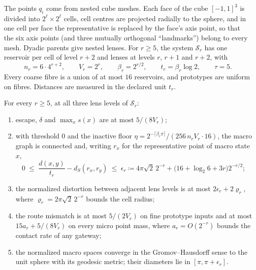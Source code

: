 The points $q_i$ come from nested cube meshes.
Each face of the cube $[-1,1]^3$ is divided into $2^{\ell}\times2^{\ell}$ cells, cell centres are projected radially to the sphere, and in one cell per face the representative is replaced by the face's axis point, so that the six axis points (and three mutually orthogonal ``landmarks'') belong to every mesh.
Dyadic parents give nested lenses.
For $r\ge5$, the system $\mathcal S_r$ has one reservoir per cell of level $r+2$ and lenses at levels $r$, $r+1$ and $r+2$, with
\begin{equation}
n_r=6\cdot4^{r+2},\qquad V_r=2^r,\qquad \beta_r=2^{r/2},\qquad t_r=\beta_r\log2,\qquad\tau=5.
\end{equation}
Every coarse fibre is a union of at most $16$ reservoirs, and prototypes are uniform on fibres.
Distances are measured in the declared unit $t_r$.

\begin{theorem}
\label{thm:sphere}
For every $r\ge5$, at all three lens levels of $\mathcal S_r$:
\begin{enumerate}[label=(\roman*)]
\item escape, $\delta$ and $\max_x s(x)$ are at most $5/(8V_r)$;
\item with threshold $0$ and the inactive floor $\eta=2^{-\lceil\beta_r\pi\rceil}/(256\,n_rV_r\cdot16)$, the macro graph is connected and, writing $r_x$ for the representative point of macro state $x$,
\begin{equation}
0\;\le\;\frac{d(x,y)}{t_r}-d_S(r_x,r_y)\;\le\;\epsilon_r\coloneqq 4\pi\sqrt2\,2^{-r}+\bigl(16+\log_2 6+3r\bigr)2^{-r/2};
\end{equation}
\item the normalized distortion between adjacent lens levels is at most $2\epsilon_r+2\varrho_r$, where $\varrho_r=2\pi\sqrt2\,2^{-r}$ bounds the cell radius;
\item the route mismatch is at most $5/(2V_r)$ on fine prototype inputs and at most $15a_r+5/(8V_r)$ on every micro point mass, where $a_r=O(2^{-r})$ bounds the contact rate of any gateway;
\item the normalized macro spaces converge in the Gromov--Hausdorff sense to the unit sphere with its geodesic metric; their diameters lie in $[\pi,\pi+\epsilon_r]$.
\end{enumerate}
\end{theorem}

